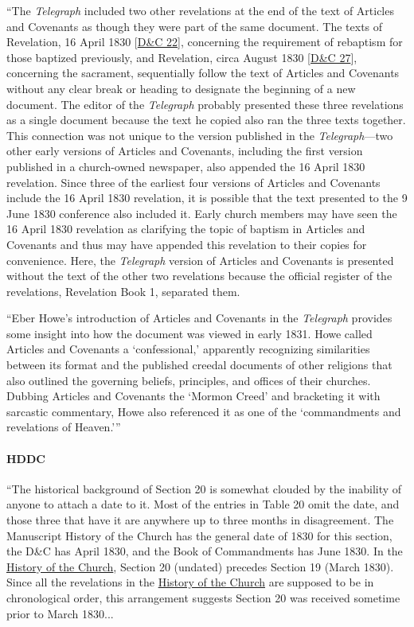 			``The \textit{Telegraph} included two other revelations at the end of the text of Articles and Covenants as though they were part of the same document. The texts of Revelation, 16 April 1830 [\hyperref[DC22]{D\&C 22}], concerning the requirement of rebaptism for those baptized previously, and Revelation, circa August 1830 [\hyperref[DC27]{D\&C 27}], concerning the sacrament, sequentially follow the text of Articles and Covenants without any clear break or heading to designate the beginning of a new document. The editor of the \textit{Telegraph} probably presented these three revelations as a single document because the text he copied also ran the three texts together. This connection was not unique to the version published in the \textit{Telegraph}---two other early versions of Articles and Covenants, including the first version published in a church-owned newspaper, also appended the 16 April 1830 revelation. Since three of the earliest four versions of Articles and Covenants include the 16 April 1830 revelation, it is possible that the text presented to the 9 June 1830 conference also included it. Early church members may have seen the 16 April 1830 revelation as clarifying the topic of baptism in Articles and Covenants and thus may have appended this revelation to their copies for convenience. Here, the \textit{Telegraph} version of Articles and Covenants is presented without the text of the other two revelations because the official register of the revelations, Revelation Book 1, separated them.

			``Eber Howe's introduction of Articles and Covenants in the \textit{Telegraph} provides some insight into how the document was viewed in early 1831. Howe called Articles and Covenants a `confessional,' apparently recognizing similarities between its format and the published creedal documents of other religions that also outlined the governing beliefs, principles, and offices of their churches. Dubbing Articles and Covenants the `Mormon Creed' and bracketing it with sarcastic commentary, Howe also referenced it as one of the `commandments and revelations of Heaven.'''
			
		\paragraph{HDDC}
		
			``The historical background of Section 20 is somewhat clouded by the inability of anyone to attach a date to it. Most of the entries in Table 20 omit the date, and those three that have it are anywhere up to three months in disagreement. The Manuscript History of the Church has the general date of 1830 for this section, the D\&C has April 1830, and the Book of Commandments has June 1830. In the \uline{History of the Church}, Section 20 (undated) precedes Section 19 (March 1830). Since all the revelations in the \uline{History of the Church} are supposed to be in chronological order, this arrangement suggests Section 20 was received sometime prior to March 1830...
			

